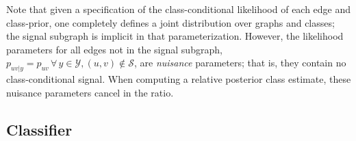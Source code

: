 \documentclass[10pt,journal,cspaper,compsoc]{IEEEtran}
\providecommand{\mc}[1]{\mathcal{#1}}
\begin{document}
Note that given a specification of the class-conditional likelihood of each edge and class-prior, one completely defines a joint distribution over graphs and classes; the signal subgraph is implicit in that parameterization. However, the likelihood parameters for all edges not in the signal subgraph, $p_{uv|y}=p_{uv} \, \forall \, y \in \mc{Y}, (u,v) \notin \mc{S}$,  are \emph{nuisance} parameters; that is, they contain no class-conditional signal.  When computing a relative posterior class estimate, these nuisance parameters cancel in the ratio.




\subsection{Classifier} %
\label{sub:classifier}
\end{document}
